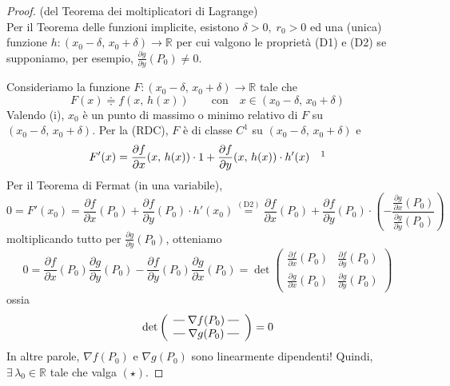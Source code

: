 \begin{proof}
(del Teorema dei moltiplicatori di Lagrange)\\
Per il Teorema delle funzioni implicite, esistono $\delta > 0,\; r_0 > 0$ ed una (unica) funzione $h : (x_0 - \delta,\, x_0 + \delta) \longrightarrow \mathbb{R}$ per cui valgono le proprietà (D1) e (D2) se supponiamo, per esempio, $\frac{\partial g}{\partial y}(P_0) \neq 0$.

Consideriamo la funzione $F : (x_0 - \delta,\, x_0 + \delta) \longrightarrow \mathbb{R}$ tale che
$$
F(x) \doteqdot f(x,\,h(x)) \qquad \text{con} \quad x \in (x_0 - \delta,\, x_0 + \delta)
$$
Valendo (i), $x_0$ è un punto di massimo o minimo relativo di $F$ su $(x_0 - \delta,\, x_0 + \delta)$. Per la (RDC), $F$ è di classe $C^1$ su $(x_0 - \delta,\, x_0 + \delta)$ e
$$
F'(x) = \frac{\partial f}{\partial x} (x,\,h(x)) \cdot 1 + \frac{\partial f}{\partial y} (x,\,h(x)) \cdot h'(x) \quad \footnotemark
$$
Per il Teorema di Fermat (in una variabile),
$$
0 = F'(x_0) =
\frac{\partial f}{\partial x} (P_0) + \frac{\partial f}{\partial y} (P_0) \cdot h'(x_0)
\overset{\mathrm{(D2)}}{=}
\frac{\partial f}{\partial x} (P_0) + \frac{\partial f}{\partial y} (P_0) \cdot 
\left(
- \frac{\displaystyle \frac{\partial g}{\partial x} \left( P_0 \right)}{\displaystyle \frac{\partial g}{\partial y} \left( P_0 \right)}
\right)
$$
moltiplicando tutto per $\frac{\partial g}{\partial y} (P_0)$, otteniamo
$$
0 = 
\frac{\partial f}{\partial x} (P_0) \frac{\partial g}{\partial y} (P_0) -
\frac{\partial f}{\partial y} (P_0) \frac{\partial g}{\partial x} (P_0) =
\det
\left(
\begin{array}{cc}
\frac{\partial f}{\partial x} (P_0) & \frac{\partial f}{\partial y} (P_0)\\
\frac{\partial g}{\partial x} (P_0) & \frac{\partial g}{\partial y} (P_0)
\end{array}
\right)
$$
ossia
$$
\det
\left(
\begin{array}{cc}
\Rigaln{\nabla f(P_0)} \\
\Rigaln{\nabla g(P_0)}
\end{array}
\right)
= 0
$$
In altre parole, $\nabla f(P_0)$ e $\nabla g(P_0)$ sono linearmente dipendenti! Quindi, $\exists \, \lambda_0 \in \mathbb{R}$ tale che valga $\mathrm{(\star)}$.
\end{proof}


